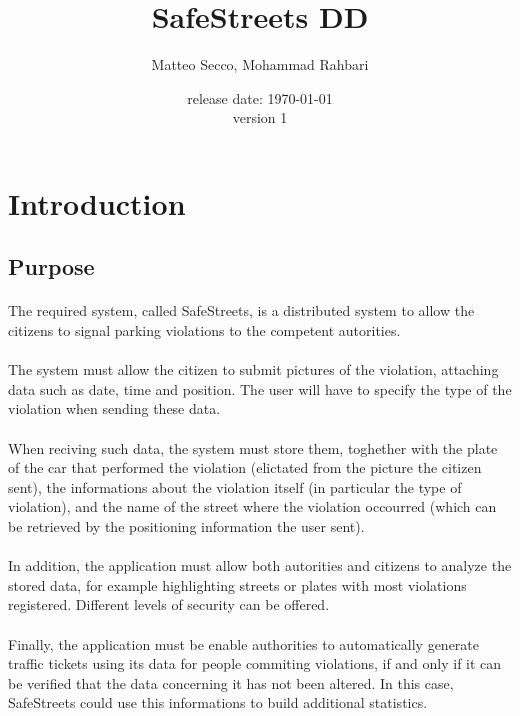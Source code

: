 \documentclass{article}
\title{SafeStreets DD}
\date{release date: \today\\version 1}
\author{Matteo Secco, Mohammad Rahbari}
\begin{document}
\maketitle
\newpage
\tableofcontents
\pagebreak
{}


\section{Introduction}

	\subsection{Purpose}
	
		\paragraph{}The required system, called SafeStreets, is a distributed system to allow the citizens to signal parking violations to the competent autorities.
		\paragraph{}The system must allow the citizen to submit pictures of the violation, attaching data such as date, time and position. The user will have to specify the type of the violation when sending these data. 
		\paragraph{}When reciving such data, the system must store them, toghether with the plate of the car that performed the violation (elictated from the picture the citizen sent), the informations about the violation itself (in particular the type of violation), and the name of the street where the violation occourred (which can be retrieved by the positioning information the user sent).
		\paragraph{}In addition, the application must allow both autorities and citizens to analyze the stored data, for example highlighting streets or plates with most violations registered. Different levels of security can be offered.
		\paragraph{}Finally, the application must be enable authorities to automatically generate traffic tickets using its data for people commiting violations, if and only if it can be verified that the data concerning it has not been altered. In this case, SafeStreets could use this informations to build additional statistics.
\end{document}
